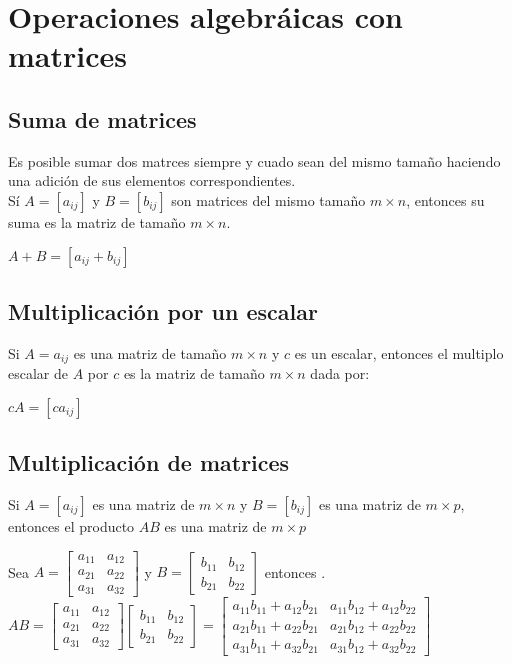 \section{Operaciones algebr\'aicas con matrices}
\subsection{Suma de matrices}
Es posible sumar dos matrces siempre y cuado sean del mismo tamaño haciendo una adici\'on de sus elementos correspondientes.\\
S\'i $A=[a_{ij}]$ y $B=[b_{ij}]$ son matrices del mismo tamaño $m \times n$, entonces su suma es la matriz de tamaño $m \times n$. \\
\begin{center}
$A+B=[a_{ij}+b_{ij}]$
\end{center}
\subsection{Multiplicaci\'on por un escalar}
Si $A=a_{ij}$ es una matriz de tamaño $m \times n$ y $c$ es un escalar, entonces el multiplo escalar de $A$ por $c$ es la matriz de tamaño $m \times n$ dada por:
\begin{center}
$cA=[ca_{ij}]$
\end{center}  
\subsection{Multiplicaci\'on de matrices}
Si $A=[a_{ij}]$ es una matriz de $m \times n$ y $B=[b_{ij}]$ es una matriz de $m \times p$, entonces el producto $AB$ es una matriz de $m \times p$
\begin{center}
Sea $A=\begin{bmatrix}
a_{11} & a_{12}\\
a_{21} & a_{22}\\
a_{31} & a_{32}
\end{bmatrix}$ y $B=\begin{bmatrix}
b_{11} & b_{12}\\
b_{21} & b_{22}
\end{bmatrix}$ entonces \bigskip \bigskip .
$AB=\begin{bmatrix}
a_{11} & a_{12}\\
a_{21} & a_{22}\\
a_{31} & a_{32}
\end{bmatrix}
\begin{bmatrix}
b_{11} & b_{12}\\
b_{21} & b_{22}
\end{bmatrix}=
\begin{bmatrix}
a_{11}b_{11}+a_{12}b_{21} & a_{11}b_{12}+a_{12}b_{22}\\
a_{21}b_{11}+a_{22}b_{21} & a_{21}b_{12}+a_{22}b_{22}\\
a_{31}b_{11}+a_{32}b_{21} & a_{31}b_{12}+a_{32}b_{22}
\end{bmatrix}$
\end{center}
